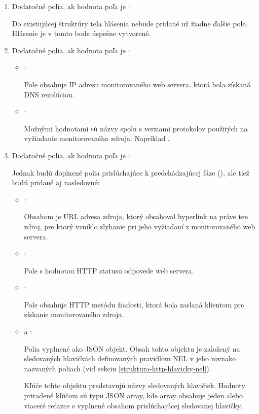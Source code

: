 \begin{enumerate}
    \item Dodatočné polia, ak hodnota poľa  je :

    Do existujúcej štruktúry tela hlásenia nebude pridané už žiadne ďalšie pole.
    Hlásenie je v tomto bode úspešne vytvorené.
    
    \item Dodatočné polia, ak hodnota poľa  je :
    \begin{itemize}
        \item {}:
    
        Pole obsahuje IP adresu monitorovaného web servera, ktorá bola získaná DNS rezolúciou.
        
        \item {}:
    
        Možnými hodnotami sú názvy spolu s verziami protokolov použitých na vyžiadanie monitorovaného zdroja.
        Napríklad .
    \end{itemize}
    
    \item Dodatočné polia, ak hodnota poľa  je :

    Jednak budú doplnené polia prislúchajúce k predchádzajúcej fáze (), ale tiež budú pridané aj nasledovné:
    \begin{itemize}
        \item {}:

        Obsahom je URL adresa zdroja, ktorý obsahoval hyperlink na práve ten zdroj, pre ktorý vzniklo zlyhanie pri jeho vyžiadaní z monitorovaného web servera.

        \item {}:

        Pole s hodnotou HTTP statusu odpovede web servera.

        \item {}:

        Pole obsahuje HTTP metódu žiadosti, ktorá bola zaslaná klientom pre získanie monitorovaného zdroja.
        
        \item {} a :
    
        Polia vyplnené ako JSON objekt. 
        Obsah tohto objektu je založený na sledovaných hlavičkách definovaných pravidlom NEL v jeho rovnako nazvaných poliach (viď sekciu \ref{struktura-http-hlavicky-nel}).
        
        Kľúče tohto objektu predstavujú názvy sledovaných hlavičiek.
        Hodnoty priradené kľúčom sú typu JSON array, kde array obsahuje jeden alebo viaceré reťazce s vyplnené obsahom prislúchajúcej sledovanej hlavičky.
        
    \end{itemize}    
\end{enumerate}


